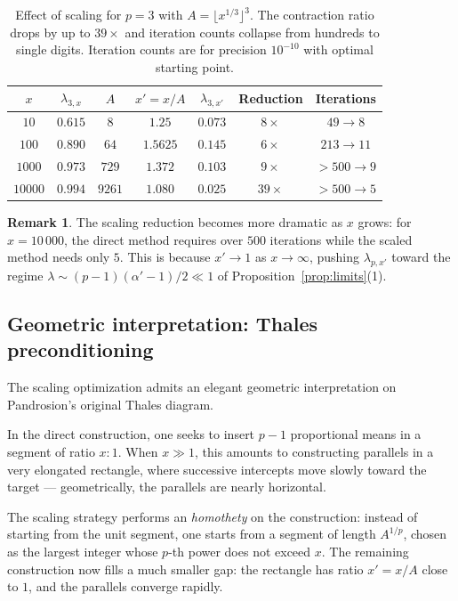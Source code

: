 \documentclass[11pt,a4paper]{article}
\theoremstyle{definition}
\newtheorem{remark}{Remark}[section]
\begin{document}
\begin{table}[h]
\centering
\begin{tabular}{ccccccc}
\toprule
$x$ & $\lambda_{3,x}$ & $A$ & $x' = x/A$ & $\lambda_{3,x'}$ & Reduction & Iterations \\
\midrule
$10$ & $0.615$ & $8$ & $1.25$ & $0.073$ & $8\times$ & $49 \to 8$ \\
$100$ & $0.890$ & $64$ & $1.5625$ & $0.145$ & $6\times$ & $213 \to 11$\\
$1000$ & $0.973$ & $729$ & $1.372$ & $0.103$ & $9\times$ & $>500 \to 9$ \\
$10000$ & $0.994$ & $9261$ & $1.080$ & $0.025$ & $39\times$ & $>500 \to 5$ \\
\bottomrule
\end{tabular}
\caption{Effect of scaling for $p = 3$ with $A = \lfloor x^{1/3} \rfloor^3$. The contraction ratio drops by up to $39\times$ and iteration counts collapse from hundreds to single digits. Iteration counts are for precision $10^{-10}$ with optimal starting point.}
\end{table}

\begin{remark}
The scaling reduction becomes more dramatic as $x$ grows: for $x = 10\,000$, the direct method requires over $500$ iterations while the scaled method needs only $5$. This is because $x' \to 1$ as $x \to \infty$, pushing $\lambda_{p,x'}$ toward the regime $\lambda \sim (p-1)(\alpha'-1)/2 \ll 1$ of Proposition~\ref{prop:limits}(1).
\end{remark}

\subsection{Geometric interpretation: Thales preconditioning}
\label{subsec:thales_preconditioning}

The scaling optimization admits an elegant geometric interpretation on Pandrosion's original Thales diagram.

\medskip

In the direct construction, one seeks to insert $p-1$ proportional means in a segment of ratio $x : 1$. When $x \gg 1$, this amounts to constructing parallels in a very elongated rectangle, where successive intercepts move slowly toward the target --- geometrically, the parallels are nearly horizontal.

\smallskip

The scaling strategy performs an \emph{homothety} on the construction: instead of starting from the unit segment, one starts from a segment of length $A^{1/p}$, chosen as the largest integer whose $p$-th power does not exceed $x$. The remaining construction now fills a much smaller gap: the rectangle has ratio $x' = x/A$ close to $1$, and the parallels converge rapidly.
\end{document}
